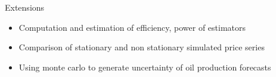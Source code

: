 \documentclass{beamer}
\begin{document}
\begin{frame}[plain]
	Extensions
	\begin{itemize}
		\item Computation and estimation of efficiency, power of estimators
		\item Comparison of stationary and non stationary simulated price series
		\item Using monte carlo to generate uncertainty of oil production forecasts
	\end{itemize}
\end{frame}
\end{document}
